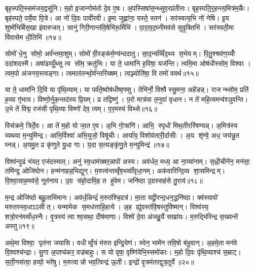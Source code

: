 बृह॒स्पति॒स्सम॑जय॒द्वसू॑नि। म॒हो व्र॒जान्गोम॑तो दे॒व ए॒षः। अ॒पस्सिषा॑स॒न्थ्सुव॒रप्र॑तीत्तः। बृह॒स्पति॒र्॒हन्त्य॒मित्र॑म॒र्कैः। बृह॑स्पते॒ पर्ये॒वा पि॒त्रे। आ नो॑ दि॒वः पावी॑रवी। इ॒मा जुह्वा॑ना॒ यस्ते॒ स्तन॑। सर॑स्वत्य॒भि नो॑ नेषि। इ॒य शुष्मे॑भिर्बिस॒खा इ॑वारुजत्। सानु॑ गिरी॒णान्त॑वि॒षेभि॑रू॒र्मिभि॑। पा॒रा॒व॒द॒घ्नीमव॑से सुवृ॒क्तिभि॑। सर॑स्वती॒मा वि॑वासेम धी॒तिभि॑॥१४॥\anuvakamend[दे॒व॒यानैर्दे॒वास्सुपू॑तय्यँजत्र॒ हस्त॒मस्ति॒ तमास्यू॒र्मिभि॒र्द्वे च॑]

सोमो॑ धे॒नु सोमो॒ अर्व॑न्तमा॒शुम्। सोमो॑ वी॒रङ्क॑र्म॒ण्य॑न्ददातु। सा॒द॒न्य॑व्विँद॒थ्य स॒भेयम्। पि॒तु॒श्श्रव॑ण॒य्योँ ददा॑शदस्मै। अषा॑ढय्युँ॒थ्सु त्व सो॑म॒ क्रतु॑भिः। या ते॒ धामा॑नि ह॒विषा॒ यज॑न्ति। त्वमि॒मा ओष॑धीस्सोम॒ विश्वाः। त्वम॒पो अ॑जनय॒स्त्वङ्गाः। त्वमात॑तन्थो॒र्व॑न्तरि॑ख्षम्। त्वञ्ज्योति॑षा॒ वि तमो॑ ववर्थ॥१५॥

या ते॒ धामा॑नि दि॒वि या पृ॑थि॒व्याम्। या पर्व॑ते॒ष्वोष॑धीष्व॒फ्सु। तेभि॑र्नो॒ विश्वैस्सु॒मना॒ अहे॑डन्न्। राजन्थ्सोम॒ प्रति॑ ह॒व्या गृ॑भाय। विष्णो॒र्नुक॒न्तद॑स्य प्रि॒यम्। प्र तद्विष्णु॑। प॒रो मात्र॑या त॒नुवा॑ वृधान। न ते॑ महि॒त्वमन्व॑श्ञुवन्ति। उ॒भे ते॑ विद्म॒ रज॑सी पृथि॒व्या विष्णो॑ देव॒ त्वम्। प॒र॒मस्य॑ विथ्से॥१६॥

विच॑क्रमे॒ त्रिर्दे॒वः। आ ते॑ म॒हो यो जा॒त ए॒व। अ॒भि गो॒त्राणि॑। आभि॒ स्पृधो॑ मिथ॒तीररि॑षण्यन्न्। अ॒मित्र॑स्य व्यथया म॒न्युमि॑न्द्र। आभि॒र्विश्वा॑ अभि॒युजो॒ विषू॑चीः। आर्या॑य॒ विशोव॑तारी॒र्दासीः। अ॒य शृ॑ण्वे॒ अध॒ जय॑न्नु॒त घ्नन्न्। अ॒यमु॒त प्र कृ॑णुते यु॒धा गाः। य॒दा स॒त्यङ्कृ॑णु॒ते म॒न्युमिन्द्र॑॥१७॥

विश्व॑न्दृ॒ढं भ॑यत॒ एज॑दस्मात्। अनु॑ स्व॒धाम॑ख्षर॒न्नापो॑ अस्य। अव॑र्धत॒ मध्य॒ आ ना॒व्या॑नाम्। स॒ध्री॒चीने॑न॒ मन॑सा॒ तमि॑न्द्र॒ ओजि॑ष्ठेन। हन्म॑नाहन्न॒भिद्यून्। म॒रुत्व॑न्तव्वृँष॒भव्वाँ॑वृधा॒नम्। अक॑वारिन्दि॒व्य शा॒समिन्द्रम्। वि॒श्वा॒साह॒मव॑से॒ नूत॑नाय। उ॒ग्र स॑हो॒दामि॒ह त हु॑वेम। जनि॑ष्ठा उ॒ग्रस्सह॑से तु॒राय॑॥१८॥

म॒न्द्र ओजि॑ष्ठो बहु॒लाभि॑मानः। अव॑र्ध॒न्निन्द्रं॑ म॒रुत॑श्चि॒दत्र॑। मा॒ता यद्वी॒रन्द॒धन॒द्धनि॑ष्ठा। क्व॑स्यावो॑ मरुतस्स्व॒धाऽऽसीत्। यन्मामेक स॒मध॑त्ताहि॒हत्ये। अ॒ह ह्यु॑ग्रस्त॑वि॒षस्तुवि॑ष्मान्। विश्व॑स्य॒ शत्रो॒रन॑मव्वँध॒स्नैः। वृ॒त्रस्य॑ त्वा श्व॒सथा॒ दीष॑माणाः। विश्वे॑ दे॒वा अ॑जहु॒र्ये सखा॑यः। म॒रुद्भि॑रिन्द्र स॒ख्यन्ते॑ अस्तु॥१९॥

अथे॒मा विश्वा॒ पृत॑ना जयासि। वधीव्वृँ॒त्रं म॑रुत इन्द्रि॒येण॑। स्वेन॒ भामे॑न तवि॒षो ब॑भू॒वान्। अ॒हमे॒ता मन॑वे वि॒श्वश्च॑न्द्राः। सु॒गा अ॒पश्च॑कर॒ वज्र॑बाहुः। स यो वृषा॒ वृष्णि॑येभि॒स्समो॑काः। म॒हो दि॒वः पृ॑थि॒व्याश्च॑ स॒म्राट्। स॒ती॒नस॑त्वा॒ हव्यो॒ भरे॑षु। म॒रुत्वान्नो भव॒त्विन्द्र॑ ऊ॒ती। इन्द्रो॑ वृ॒त्रम॑तरद्वृत्र॒तूर्ये॥२०॥

